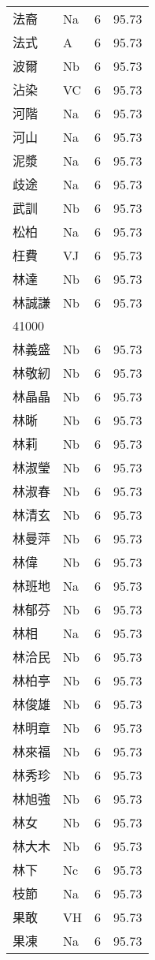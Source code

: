 \documentclass[twocolumn]{book}
\begin{document}
\begin{supertabular}{llrr}
法裔 & Na & 6 &  95.73\\
法式 & A & 6 &  95.73\\
波爾 & Nb & 6 &  95.73\\
沾染 & VC & 6 &  95.73\\
河階 & Na & 6 &  95.73\\
河山 & Na & 6 &  95.73\\
泥漿 & Na & 6 &  95.73\\
歧途 & Na & 6 &  95.73\\
武訓 & Nb & 6 &  95.73\\
松柏 & Na & 6 &  95.73\\
枉費 & VJ & 6 &  95.73\\
林達 & Nb & 6 &  95.73\\
林誠謙 & Nb & 6 &  95.73\\
41000\\
林義盛 & Nb & 6 &  95.73\\
林敬紉 & Nb & 6 &  95.73\\
林晶晶 & Nb & 6 &  95.73\\
林晰 & Nb & 6 &  95.73\\
林莉 & Nb & 6 &  95.73\\
林淑瑩 & Nb & 6 &  95.73\\
林淑春 & Nb & 6 &  95.73\\
林清玄 & Nb & 6 &  95.73\\
林曼萍 & Nb & 6 &  95.73\\
林偉 & Nb & 6 &  95.73\\
林班地 & Na & 6 &  95.73\\
林郁芬 & Nb & 6 &  95.73\\
林相 & Na & 6 &  95.73\\
林洽民 & Nb & 6 &  95.73\\
林柏亭 & Nb & 6 &  95.73\\
林俊雄 & Nb & 6 &  95.73\\
林明章 & Nb & 6 &  95.73\\
林來福 & Nb & 6 &  95.73\\
林秀珍 & Nb & 6 &  95.73\\
林旭強 & Nb & 6 &  95.73\\
林女 & Nb & 6 &  95.73\\
林大木 & Nb & 6 &  95.73\\
林下 & Nc & 6 &  95.73\\
枝節 & Na & 6 &  95.73\\
果敢 & VH & 6 &  95.73\\
果凍 & Na & 6 &  95.73\\

\end{supertabular}
\end{document}
